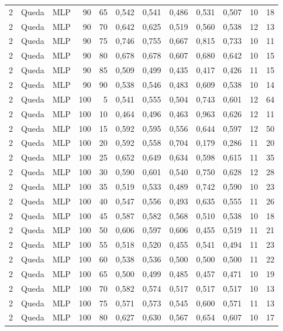 \begin{longtable}{@{}rllrrrrrrrrr@{}}
2 & Queda & MLP & 90 & 65 & 0,542 & 0,541 & 0,486 & 0,531 & 0,507 & 10 & 18 \\
2 & Queda & MLP & 90 & 70 & 0,642 & 0,625 & 0,519 & 0,560 & 0,538 & 12 & 13 \\
2 & Queda & MLP & 90 & 75 & 0,746 & 0,755 & 0,667 & 0,815 & 0,733 & 10 & 11 \\
2 & Queda & MLP & 90 & 80 & 0,678 & 0,678 & 0,607 & 0,680 & 0,642 & 10 & 15 \\
2 & Queda & MLP & 90 & 85 & 0,509 & 0,499 & 0,435 & 0,417 & 0,426 & 11 & 15 \\
2 & Queda & MLP & 90 & 90 & 0,538 & 0,546 & 0,483 & 0,609 & 0,538 & 10 & 14 \\
2 & Queda & MLP & 100 & 5 & 0,541 & 0,555 & 0,504 & 0,743 & 0,601 & 12 & 64 \\
2 & Queda & MLP & 100 & 10 & 0,464 & 0,496 & 0,463 & 0,963 & 0,626 & 12 & 11 \\
2 & Queda & MLP & 100 & 15 & 0,592 & 0,595 & 0,556 & 0,644 & 0,597 & 12 & 50 \\
2 & Queda & MLP & 100 & 20 & 0,592 & 0,558 & 0,704 & 0,179 & 0,286 & 11 & 20 \\
2 & Queda & MLP & 100 & 25 & 0,652 & 0,649 & 0,634 & 0,598 & 0,615 & 11 & 35 \\
2 & Queda & MLP & 100 & 30 & 0,590 & 0,601 & 0,540 & 0,750 & 0,628 & 12 & 28 \\
2 & Queda & MLP & 100 & 35 & 0,519 & 0,533 & 0,489 & 0,742 & 0,590 & 10 & 23 \\
2 & Queda & MLP & 100 & 40 & 0,547 & 0,556 & 0,493 & 0,635 & 0,555 & 11 & 26 \\
2 & Queda & MLP & 100 & 45 & 0,587 & 0,582 & 0,568 & 0,510 & 0,538 & 10 & 18 \\
2 & Queda & MLP & 100 & 50 & 0,606 & 0,597 & 0,606 & 0,455 & 0,519 & 11 & 21 \\
2 & Queda & MLP & 100 & 55 & 0,518 & 0,520 & 0,455 & 0,541 & 0,494 & 11 & 23 \\
2 & Queda & MLP & 100 & 60 & 0,538 & 0,536 & 0,500 & 0,500 & 0,500 & 11 & 22 \\
2 & Queda & MLP & 100 & 65 & 0,500 & 0,499 & 0,485 & 0,457 & 0,471 & 10 & 19 \\
2 & Queda & MLP & 100 & 70 & 0,582 & 0,574 & 0,517 & 0,517 & 0,517 & 10 & 13 \\
2 & Queda & MLP & 100 & 75 & 0,571 & 0,573 & 0,545 & 0,600 & 0,571 & 11 & 13 \\
2 & Queda & MLP & 100 & 80 & 0,627 & 0,630 & 0,567 & 0,654 & 0,607 & 10 & 17 \\

\end{longtable}
